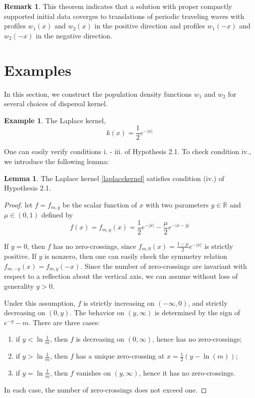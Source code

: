 \documentclass[11pt]{article}
\theoremstyle{definition}
\newtheorem{lem}[thm]{Lemma}
\newtheorem{rem}[thm]{Remark}
\newtheorem{ex}[thm]{Example}
\numberwithin{equation}{section}
\numberwithin{thm}{section}
\begin{document}
\begin{rem}
This theorem indicates that a solution with proper compactly supported initial data coverges to translations of periodic traveling waves with profiles $w_1(x)$ and $w_2(x)$ in the positive direction and profiles $w_1(-x)$ and $w_2(-x)$ in the negative direction.
\end{rem}

\section{Examples}

In this section, we construct the population density functions $w_1$ and $w_2$ for several choices of dispersal kernel.

\begin{ex}
The Laplace kernel,
\begin{equation}\label{laplacekernel}
k(x) = \frac{1}{2} e^{-|x|}
\end{equation}

One can easily verify conditions i. - iii. of Hypothesis 2.1. To check condition iv., we introduce the following lemma:

\begin{lem}
The Laplace kernel \eqref{laplacekernel} satisfies condition (iv.) of Hypothesis 2.1.
\end{lem}

\begin{proof}
let $f=f_{m,y}$ be the scalar function of $x$ with two parameters $y\in\mathbb R$ and $\mu\in(0,1)$ defined by
$$ f(x)= f_{m,y}(x) = \frac{1}{2} e^{-|x|} - \frac{\mu}{2}e^{-|x-y|} $$

If $y=0$, then $f$ has no zero-crossings, since $f_{m,0}(x)=\frac{1-\mu}{2}e^{-|x|}$ is strictly positive. If $y$ is nonzero, then one can easily check the symmetry relation $f_{m,-y}(x)=f_{m,y}(-x)$. Since the number of zero-crossings are invariant with respect to a reflection about the vertical axis, we can assume without loss of generality $y>0$.

Under this assumption, $f$ is strictly increasing on $(-\infty,0)$, and strictly decreasing on $(0,y)$. The behavior on $(y,\infty)$ is determined by the sign of $e^{-y}-m$. There are three cases:

\begin{enumerate}
\item if $y<\ln\frac{1}{m}$, then $f$ is decreasing on $(0,\infty)$, hence has no zero-crossings;
\item if $y>\ln\frac{1}{m}$, then $f$ has a unique zero-crossing at $x=\frac{1}{2}(y-\ln(m))$;
\item if $y=\ln\frac{1}{m}$, then $f$ vanishes on $(y,\infty)$, hence it has no zero-crossings.
\end{enumerate}
In each case, the number of zero-crossings does not exceed one.
\end{proof}


\end{ex}
\end{document}
